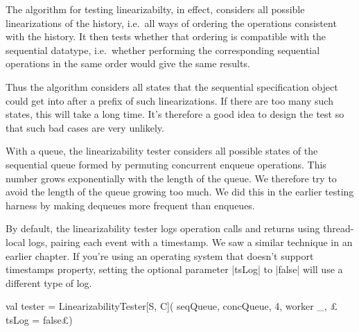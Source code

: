 \begin{slide}

The algorithm for testing linearizabilty, in effect, considers all possible
linearizations of the history, i.e.~all ways of ordering the operations
consistent with the history.  It then tests whether that ordering is
compatible with the sequential datatype, i.e.~whether performing the
corresponding sequential operations in the same order would give the same
results. 

Thus the algorithm considers all  states that the sequential
specification object could get into after a prefix of such linearizations.
%
If there are too many such states, this will take a long time.  It's therefore
a good idea to design the test so that such bad cases are very unlikely.
\end{slide}


\begin{slide}

With a queue, the linearizability tester considers all possible states of the
sequential queue formed by permuting concurrent enqueue operations.  This
number grows exponentially with the length of the queue.  We therefore try to
avoid the length of the queue growing too much.  We did this in the earlier
testing harness by making dequeues more frequent than enqueues.
\end{slide}


\begin{slide}

By default, the linearizability tester logs operation calls and returns using
thread-local logs, pairing each event with a timestamp.  We saw a similar
technique in an earlier chapter.  If you're using an operating system that
doesn't support timestamps property, setting the optional parameter |tsLog| to
|false| will use a different type of log.
%
\begin{scala}
  val tester = LinearizabilityTester[S, C](
    seqQueue, concQueue, 4, worker _, £\scalastyle\color{red} tsLog = false£)
\end{scala}
\end{slide}




